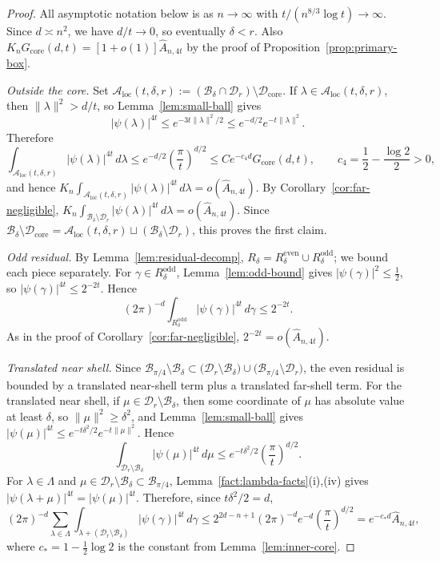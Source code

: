 \documentclass[11pt]{article}
\theoremstyle{definition}
\newcommand{\Bbox}{\mathcal{B}}
\newcommand{\Dd}{\mathcal{D}}
\newcommand{\corereg}{\mathcal{D}_\mathrm{core}}
\newcommand{\core}{G_{\mathrm{core}}}
\newcommand{\Ahat}{\hat A_{n,4t}}
\begin{document}
\begin{proof}
All asymptotic notation below is as \(n\to\infty\) with \(t/(n^{8/3}\log t)\to\infty\).
Since \(d\asymp n^2\), we have \(d/t\to 0\), so eventually \(\delta<r\). Also
\(K_n\core(d,t)=[1+o(1)]\Ahat\)
by the proof of Proposition~\ref{prop:primary-box}.

\emph{Outside the core.}
Set \(\mathcal A_{\mathrm{loc}}(t,\delta,r):=(\Bbox_\delta\cap\Dd_r)\setminus\corereg\).
If \(\lambda\in\mathcal A_{\mathrm{loc}}(t,\delta,r)\), then \(\|\lambda\|^2>d/t\), so Lemma~\ref{lem:small-ball} gives
\[
  |\psi(\lambda)|^{4t}
  \le e^{-3t\|\lambda\|^2/2}
  \le e^{-d/2}e^{-t\|\lambda\|^2}.
\]
Therefore
\[
  \int_{\mathcal A_{\mathrm{loc}}(t,\delta,r)}|\psi(\lambda)|^{4t}\,d\lambda
  \le e^{-d/2}\left(\frac{\pi}{t}\right)^{d/2}
  \le Ce^{-c_4 d}\core(d,t),
  \qquad
  c_4=\frac12-\frac{\log2}{2}>0,
\]
and hence \(K_n\int_{\mathcal A_{\mathrm{loc}}(t,\delta,r)}|\psi(\lambda)|^{4t}\,d\lambda=o(\Ahat)\).
By Corollary~\ref{cor:far-negligible},
\(K_n\int_{\Bbox_\delta\setminus\Dd_r}|\psi(\lambda)|^{4t}\,d\lambda=o(\Ahat)\). Since
\(\Bbox_\delta\setminus\corereg
=\mathcal A_{\mathrm{loc}}(t,\delta,r)\sqcup(\Bbox_\delta\setminus\Dd_r)\),
this proves the first claim.

\emph{Odd residual.}
By Lemma~\ref{lem:residual-decomp}, \(R_\delta=R_\delta^{\mathrm{even}}\cup R_\delta^{\mathrm{odd}}\); we bound each piece separately.
For \(\gamma\in R_\delta^{\mathrm{odd}}\), Lemma~\ref{lem:odd-bound} gives
\(|\psi(\gamma)|^2\le \frac12\), so \(|\psi(\gamma)|^{4t}\le 2^{-2t}\). Hence
\[
  (2\pi)^{-d}\int_{R_\delta^{\mathrm{odd}}}|\psi(\gamma)|^{4t}\,d\gamma\le 2^{-2t}.
\]
As in the proof of Corollary~\ref{cor:far-negligible}, \(2^{-2t}=o(\Ahat)\).

\emph{Translated near shell.}
Since
\(\Bbox_{\pi/4}\setminus\Bbox_\delta
\subset
\bigl(\Dd_r\setminus\Bbox_\delta\bigr)\cup\bigl(\Bbox_{\pi/4}\setminus\Dd_r\bigr)\),
the even residual is bounded by a translated near-shell term plus a translated far-shell term. For the translated near shell, if \(\mu\in\Dd_r\setminus\Bbox_\delta\), then some coordinate of \(\mu\) has absolute value at least \(\delta\), so \(\|\mu\|^2\ge \delta^2\), and Lemma~\ref{lem:small-ball} gives
\(|\psi(\mu)|^{4t}\le e^{-t\delta^2/2}e^{-t\|\mu\|^2}\).
Hence
\[
  \int_{\Dd_r\setminus\Bbox_\delta}|\psi(\mu)|^{4t}\,d\mu
  \le e^{-t\delta^2/2}\left(\frac{\pi}{t}\right)^{d/2}.
\]
For \(\lambda\in\Lambda\) and \(\mu\in\Dd_r\setminus\Bbox_\delta\subset\Bbox_{\pi/4}\), Lemma~\ref{fact:lambda-facts}(i),(iv) gives
\(|\psi(\lambda+\mu)|^{4t}=|\psi(\mu)|^{4t}\).
Therefore, since \(t\delta^2/2=d\),
\[
  (2\pi)^{-d}\sum_{\lambda\in\Lambda}\int_{\lambda+(\Dd_r\setminus\Bbox_\delta)}|\psi(\gamma)|^{4t}\,d\gamma
  \le
  2^{2d-n+1}(2\pi)^{-d}e^{-d}\left(\frac{\pi}{t}\right)^{d/2}
  = e^{-c_* d}\Ahat,
\]
where \(c_*=1-\frac12\log 2\) is the constant from Lemma~\ref{lem:inner-core}.


\end{proof}
\end{document}
